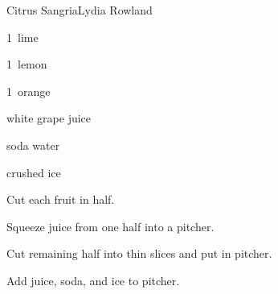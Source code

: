 \begin{recipe}{Citrus Sangria}{Lydia Rowland}{}

\begin{ingredients}
\item 1~lime
\item 1~lemon
\item 1~orange
\item {} white grape juice
\item {} soda water
\item crushed ice
\end{ingredients}

\begin{directions}
\item Cut each fruit in half.
\item Squeeze juice from one half into a pitcher.
\item Cut remaining half into thin slices and put in pitcher.
\item Add juice, soda, and ice to pitcher.
\end{directions}

\end{recipe}
